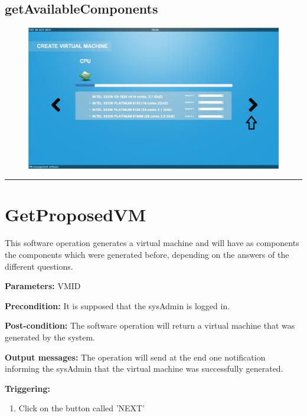 \subsection{getAvailableComponents}

\begin{figure}[H]
\centering
\includegraphics[width=170mm]{images/softAvailable.eps}
\caption{\label{overflow}}
\end{figure}


\hrule
\vspace{0.5cm}








\section{GetProposedVM}
\label{operation:GetProposedVM}
This software operation generates a virtual machine and will have as components
the components which were generated before, depending on the answers of the
different questions.
\begin{description}

\item \textbf{Parameters:} VMID
\item \textbf{Precondition:} It is supposed that the sysAdmin is logged in.
\item \textbf{Post-condition:} The software operation will return a virtual
machine that was generated by the system.
\item \textbf{Output messages:} The operation will send at the end one
notification informing the sysAdmin that the virtual machine was successfully
generated.

\item \textbf{Triggering:}
\begin{enumerate}
\item Click on the button called 'NEXT'
\end{enumerate}

 
\end{description}

